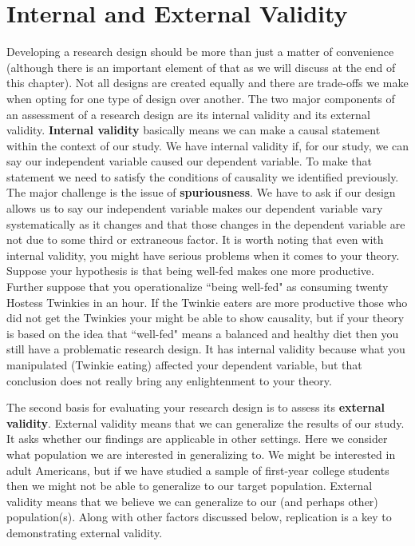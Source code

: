 \documentclass[11pt,openany]{book}\usepackage[]{graphicx}\usepackage[]{color}
\begin{document}
\section{Internal and External Validity}

Developing a research design should be more than just a matter of convenience (although there is an important element of that as we will discuss at the end of this chapter). Not all designs are created equally and there are trade-offs we make when opting for one type of design over another. The two major components of an assessment of a research design are its internal validity and its external validity. \textbf{Internal validity} basically means we can make a causal statement within the context of our study. We have internal validity if, for our study, we can say our independent variable caused our dependent variable. To make that statement we need to satisfy the conditions of causality we identified previously. The major challenge is the issue of \textbf{spuriousness}. We have to ask if our design allows us to say our independent variable makes our dependent variable vary systematically as it changes and that those changes in the dependent variable are not due to some third or extraneous factor.  It is worth noting that even with internal validity, you might have serious problems when it comes to your theory. Suppose your hypothesis is that being well-fed makes one more productive. Further suppose that you operationalize ``being well-fed" as consuming twenty Hostess Twinkies in an hour. If the Twinkie eaters are more productive those who did not get the Twinkies your might be able to show causality, but if your theory is based on the idea that ``well-fed" means a balanced and healthy diet then you still have a problematic research design. It has internal validity because what you manipulated (Twinkie eating) affected your dependent variable, but that conclusion does not really bring any enlightenment to your theory.

The second basis for evaluating your research design is to assess its \textbf{external validity}. External validity means that we can generalize the results of our study. It asks whether our findings are applicable in other settings. Here we consider what population we are interested in generalizing to. We might be interested in adult Americans, but if we have studied a sample of first-year college students then we might not be able to generalize to our target population. External validity means that we believe we can generalize to our (and perhaps other) population(s). Along with other factors discussed below, replication is a key to demonstrating external validity.
\end{document}

